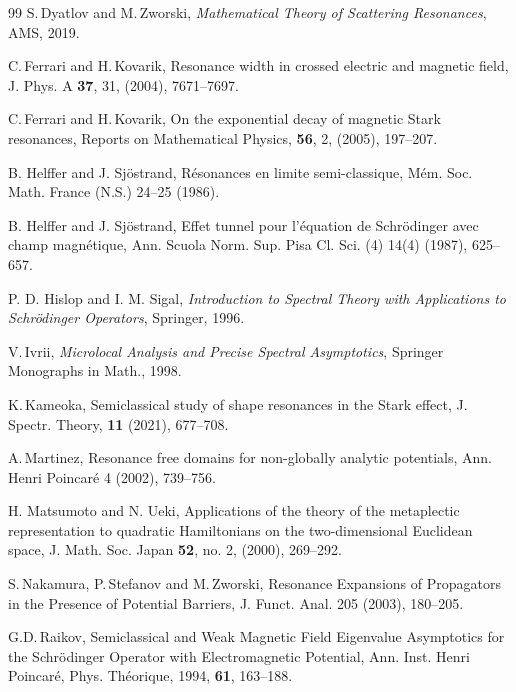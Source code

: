 \documentclass{article}
\theoremstyle{plain}
\theoremstyle{definition}
\theoremstyle{remark}
\begin{document}
\begin{thebibliography}{99}
S.\,Dyatlov and M.\,Zworski,  
{\em Mathematical Theory of Scattering Resonances},
AMS, 2019.

C.\,Ferrari and H.\,Kovarik,
Resonance width in crossed electric and magnetic field,
J. Phys. A {\bf 37}, 31, (2004), 7671–7697.

C.\,Ferrari and H.\,Kovarik,
On the exponential decay of magnetic Stark resonances,
Reports on Mathematical Physics, 
{\bf 56}, 2, (2005), 197--207.

B. Helffer and J. Sj\"{o}strand, 
R\'{e}sonances en limite semi-classique, 
M\'{e}m. Soc. Math. France (N.S.) 24--25 (1986).

 B. Helffer and J. Sj\"ostrand,
Effet tunnel pour l’\'{e}quation de Schrödinger avec champ magnétique, 
Ann. Scuola Norm. Sup. Pisa Cl. Sci. (4) 14(4) (1987), 625--657.

P. D. Hislop and I. M. Sigal, 
{\em Introduction to Spectral Theory with Applications to Schr\"{o}dinger Operators}, 
Springer, 1996.


V.\,Ivrii,
{\em Microlocal Analysis and Precise Spectral Asymptotics},
Springer Monographs in Math., 1998.

K.\,Kameoka,  
Semiclassical study of shape resonances in the Stark effect, 
J. Spectr. Theory, \textbf{11} (2021), 677--708.  

A.\,Martinez,  
Resonance free domains for non-globally analytic potentials, 
Ann. Henri Poincar\'{e} 4 (2002), 739--756.

 H. Matsumoto and N. Ueki, 
Applications of the theory of the metaplectic representation 
to quadratic Hamiltonians on the two-dimensional Euclidean space, 
J. Math. Soc. Japan {\bf 52}, no. 2, (2000), 269--292.


S.\,Nakamura, P.\,Stefanov and M.\,Zworski, 
Resonance Expansions of Propagators in the Presence of Potential Barriers, 
J. Funct. Anal. 205 (2003), 180--205.

G.D.\,Raikov,
Semiclassical and Weak Magnetic Field Eigenvalue Asymptotics for the Schr\"{o}dinger Operator with Electromagnetic Potential,  
Ann. Inst. Henri Poincar{\'e}, Phys. Th{\'e}orique, 1994, {\bf 61}, 163--188.


\end{thebibliography}
\end{document}
